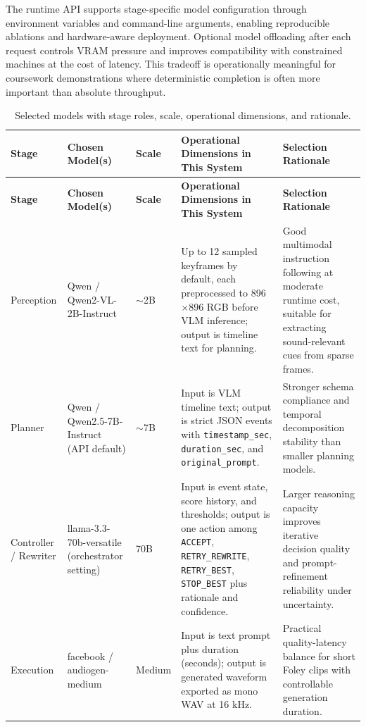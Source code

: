 \documentclass[12pt]{article}
\begin{document}
The runtime API supports stage-specific model configuration through environment variables and command-line arguments, enabling reproducible ablations and hardware-aware deployment. Optional model offloading after each request controls VRAM pressure and improves compatibility with constrained machines at the cost of latency. This tradeoff is operationally meaningful for coursework demonstrations where deterministic completion is often more important than absolute throughput.

\setlength{\tabcolsep}{3pt}
\renewcommand{\arraystretch}{1.15}
\footnotesize
\begin{longtable}{|P{1.8cm}|P{2.9cm}|P{1.6cm}|P{4.2cm}|P{4.2cm}|}
\caption{Selected models with stage roles, scale, operational dimensions, and rationale.}
\label{tab:model-selection}\\
\hline
\textbf{Stage} & \textbf{Chosen Model(s)} & \textbf{Scale} & \textbf{Operational Dimensions in This System} & \textbf{Selection Rationale} \\
\hline
\endfirsthead
\hline
\textbf{Stage} & \textbf{Chosen Model(s)} & \textbf{Scale} & \textbf{Operational Dimensions in This System} & \textbf{Selection Rationale} \\
\hline
\endhead
\hline
\endfoot
Perception & Qwen / Qwen2-VL-2B-Instruct & \(\sim\)2B & Up to 12 sampled keyframes by default, each preprocessed to 896\(\times\)896 RGB before VLM inference; output is timeline text for planning. & Good multimodal instruction following at moderate runtime cost, suitable for extracting sound-relevant cues from sparse frames. \\
\hline
Planner & Qwen / Qwen2.5-7B-Instruct (API default) & \(\sim\)7B & Input is VLM timeline text; output is strict JSON events with \texttt{timestamp\_sec}, \texttt{duration\_sec}, and \texttt{original\_prompt}. & Stronger schema compliance and temporal decomposition stability than smaller planning models. \\
\hline
Controller / Rewriter & llama-3.3-70b-versatile (orchestrator setting) & 70B & Input is event state, score history, and thresholds; output is one action among \texttt{ACCEPT}, \texttt{RETRY\_REWRITE}, \texttt{RETRY\_BEST}, \texttt{STOP\_BEST} plus rationale and confidence. & Larger reasoning capacity improves iterative decision quality and prompt-refinement reliability under uncertainty. \\
\hline
Execution & facebook / audiogen-medium & Medium & Input is text prompt plus duration (seconds); output is generated waveform exported as mono WAV at 16 kHz. & Practical quality-latency balance for short Foley clips with controllable generation duration. \\

\end{longtable}
\end{document}
